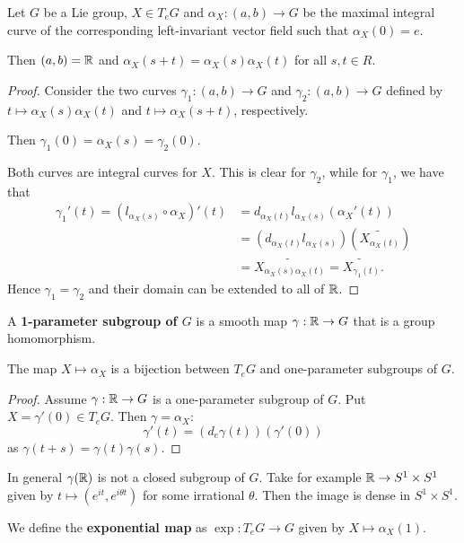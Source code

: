 \documentclass[11pt, english]{article}
\begin{document}
\begin{prop}
 Let $G$ be a Lie group, $X \in T_eG$ and $\alpha_X:(a,b) \to G$ be the maximal integral curve of the corresponding left-invariant vector field such that $\alpha_X(0)=e$.

Then $(a,b)=\mathbb{R}$ and $\alpha_X(s+t) = \alpha_X(s)\alpha_X(t)$ for all $s,t \in R$.
\end{prop}
\begin{proof}
Consider the two curves $\gamma_1:(a,b) \to G$ and $\gamma_2:(a,b) \to G$ defined by $t \mapsto \alpha_X(s) \alpha_X(t)$ and $t \mapsto \alpha_X(s+t)$, respectively. 

Then $\gamma_1(0) = \alpha_X(s) = \gamma_2(0)$.

Both curves are integral curves for $X$. This is clear for $\gamma_2$, while for $\gamma_1$, we have that
\begin{align*}
\gamma_1'(t) = ( l_{\alpha_X(s)} \circ \alpha_X)'(t) &= d_{\alpha_X(t)} l_{\alpha_X(s)}(\alpha_X'(t)) \\
&= (d_{\alpha_X(t)} l_{\alpha_X(s)})(\widetilde{X_{\alpha_X(t)}}) \\
&= \widetilde{X_{\alpha_X(s) \alpha_X(t)}} = \widetilde{X_{\gamma_1(t)}}.
\end{align*}
Hence $\gamma_1=\gamma_2$ and their domain can be extended to all of $\mathbb{R}$.
\end{proof}


A \textbf{1-parameter subgroup of $G$} is a smooth map $\gamma:\mathbb{R} \to G$ that is a group homomorphism.

\begin{corr}
 The map $X \mapsto \alpha_X$ is a bijection between $T_eG$ and one-parameter subgroups of $G$.
\end{corr}
\begin{proof}
 Assume $\gamma:\mathbb{R} \to G$ is a one-parameter subgroup of $G$. Put $X = \gamma'(0) \in T_eG$. Then $\gamma = \alpha_X$:
$$
\gamma'(t) = (d_e \gamma(t))(\gamma'(0))
$$
as $\gamma(t+s)=\gamma(t)\gamma(s)$.
\end{proof}

\begin{remark}
 In general $\gamma(\mathbb{R})$ is not a closed subgroup of $G$. Take for example $\mathbb{R} \to S^1 \times S^1$ given by $t \mapsto (e^{it},e^{i\theta t})$ for some irrational $\theta$. Then the image is dense in $S^1 \times S^1$.
\end{remark}

We define the \textbf{exponential map} as $\exp:T_e G \to G$ given by $X \mapsto \alpha_X(1)$. 
\end{document}
